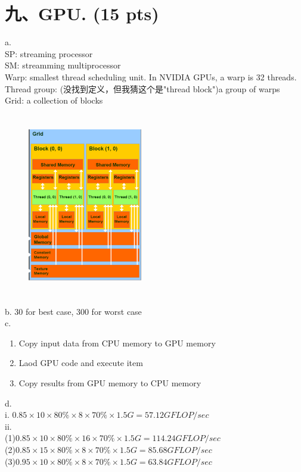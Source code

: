 \documentclass[UTF8]{ctexart}
\begin{document}
\section*{九、GPU. (15 pts)}
a.\\
SP: streaming processor\\
SM: streamming multiprocessor\\
Warp: smallest thread scheduling unit. In NVIDIA GPUs, a warp is 32 threads.\\
Thread group: (没找到定义，但我猜这个是"thread block")a group of warps\\
Grid: a collection of blocks \\
\begin{figure}[H]                                            
    \centering                                                
    \includegraphics[width=5cm,height=8cm]{9.png}        
    \caption*{}                                                                                 
\end{figure}  
b. 30 for best case, 300 for worst case\\
c.\\
\begin{enumerate}
    \item Copy input data from CPU memory to GPU memory 
    \item Laod GPU code and execute item 
    \item Copy results from GPU memory to CPU memory
\end{enumerate}
d.\\
i. $0.85\times10\times80\%\times8\times70\%\times1.5G=57.12GFLOP/sec$\\
ii. \\
(1)$0.85\times10\times80\%\times16\times70\%\times1.5G=114.24GFLOP/sec$\\
(2)$0.85\times15\times80\%\times8\times70\%\times1.5G=85.68GFLOP/sec$\\
(3)$0.95\times10\times80\%\times8\times70\%\times1.5G=63.84GFLOP/sec$\\
\end{document}
